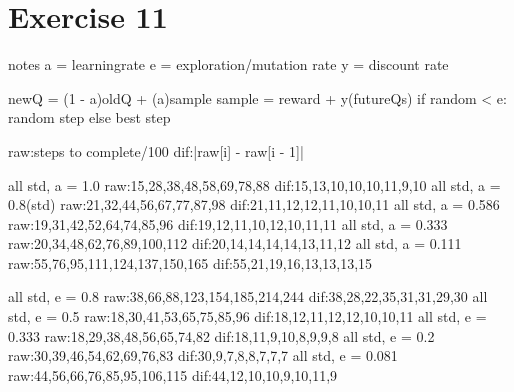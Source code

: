 \section{Exercise 11}
notes
a = learningrate
e = exploration/mutation rate
y = discount rate

newQ = (1 - a)oldQ + (a)sample
sample = reward + y(futureQs)
if random < e: random step
else best step

raw:steps to complete/100
dif:|raw[i] - raw[i - 1]|

all std, a = 1.0
raw:15,28,38,48,58,69,78,88
dif:15,13,10,10,10,11,9,10
all std, a = 0.8(std)
raw:21,32,44,56,67,77,87,98
dif:21,11,12,12,11,10,10,11
all std, a = 0.586
raw:19,31,42,52,64,74,85,96
dif:19,12,11,10,12,10,11,11
all std, a = 0.333
raw:20,34,48,62,76,89,100,112
dif:20,14,14,14,14,13,11,12
all std, a = 0.111
raw:55,76,95,111,124,137,150,165
dif:55,21,19,16,13,13,13,15

all std, e = 0.8
raw:38,66,88,123,154,185,214,244
dif:38,28,22,35,31,31,29,30
all std, e = 0.5
raw:18,30,41,53,65,75,85,96
dif:18,12,11,12,12,10,10,11
all std, e = 0.333
raw:18,29,38,48,56,65,74,82
dif:18,11,9,10,8,9,9,8
all std, e = 0.2
raw:30,39,46,54,62,69,76,83
dif:30,9,7,8,8,7,7,7
all std, e = 0.081
raw:44,56,66,76,85,95,106,115
dif:44,12,10,10,9,10,11,9
